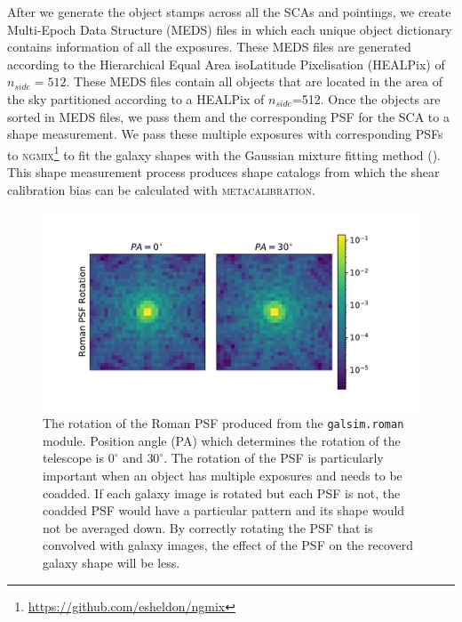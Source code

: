 \documentclass[fleqn,usenatbib]{mnras}
\begin{document}
After we generate the object stamps across all the SCAs and pointings, we create Multi-Epoch Data Structure (MEDS) files in which each unique object dictionary contains information of all the exposures. These MEDS files are generated according to the Hierarchical Equal Area isoLatitude Pixelisation (HEALPix) of $n_{side}=512$. These MEDS files contain all objects that are located in the area of the sky partitioned according to a HEALPix of $n_{side}$=512. Once the objects are sorted in MEDS files, we pass them and the corresponding PSF for the SCA to a shape measurement. We pass these multiple exposures with corresponding PSFs to \textsc{ngmix}\footnote{\url{ https://github.com/esheldon/ngmix}} to fit the galaxy shapes with the Gaussian mixture fitting method (\citealt{2014MNRAS.444L..25S}). This shape measurement process produces shape catalogs from which the shear calibration bias can be calculated with \textsc{metacalibration}.

\begin{figure}
	\includegraphics[width=\columnwidth]{figure1.pdf}
	\vspace*{-3mm}
    \caption{The rotation of the Roman PSF produced from the \texttt{galsim.roman} module. Position angle (PA) which determines the rotation of the telescope is $0^{\circ}$ and $30^{\circ}$. The rotation of the PSF is particularly important when an object has multiple exposures and needs to be coadded. If each galaxy image is rotated but each PSF is not, the coadded PSF would have a particular pattern and its shape would not be averaged down. By correctly rotating the PSF that is convolved with galaxy images, the effect of the PSF on the recoverd galaxy shape will be less.}
    \label{fig:psfrot}
\end{figure}
\end{document}
